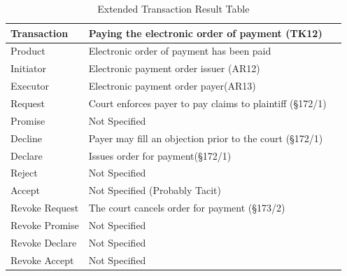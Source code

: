 \begin{landscape}
\begin{table}[h]
\caption{Extended Transaction Result Table}
\label{tab:etrt}
\begin{tabular}{|l||l|l|}
\hline
Transaction  &  Paying the electronic order of payment (TK12) \\ \hline
Product      &  Electronic order of payment has been paid \\ \hline
Initiator      &  Electronic payment order issuer (AR12) \\ \hline
Executor       &  Electronic payment order payer(AR13) \\ \hline
Request        &    Court enforces payer to pay claims to plaintiff (\S172/1)
  \\ \hline
Promise        &    Not Specified   \\ \hline
Decline        &  Payer may fill an objection prior to the court (\S172/1)  \\ \hline
Declare        &  Issues order for payment(\S172/1)  \\ \hline
Reject         &  Not Specified   \\ \hline
Accept         & Not Specified (Probably Tacit) \\ \hline
Revoke Request & The court cancels order for payment (\S173/2)       \\ \hline
Revoke Promise & Not Specified  \\ \hline
Revoke Declare & Not Specified      \\ \hline
Revoke Accept  &  Not Specified \\ \hline
\end{tabular}
\end{table}


\end{landscape}
